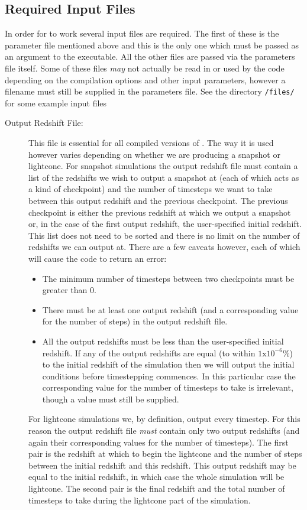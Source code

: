 \documentclass[12pt,twoside,a4paper]{article}
\begin{document}
\subsection{Required Input Files}
In order for {\PICOLA} to work several input files are required. The first of these is the parameter file mentioned above and this is the only one which must be passed as an argument to the executable. All the other files are passed via the parameters file itself. Some of these files \emph{may} not actually be read in or used by the code depending on the compilation options and other input parameters, however a filename must still be supplied in the parameters file. See the directory \texttt{/files/} for some example input files
\begin{description}
  \item[Output Redshift File:]{This file is essential for all compiled versions of {\PICOLA}. The way it is used however varies depending on whether we are producing a snapshot or lightcone. For snapshot simulations the output redshift file must contain a list of the redshifts we wish to output a snapshot at (each of which acts as a kind of checkpoint) and the number of timesteps we want to take between this output redshift and the previous checkpoint. The previous checkpoint is either the previous redshift at which we output a snapshot or, in the case of the first output redshift, the user-specified initial redshift. This list does not need to be sorted and there is no limit on the number of redshifts we can output at. There are a few caveats however, each of which will cause the code to return an error:
  \begin{itemize}
    \item{The minimum number of timesteps between two checkpoints must be greater than 0.}
    \item{There must be at least one output redshift (and a corresponding value for the number of steps) in the output redshift file.}
    \item{All the output redshifts must be less than the user-specified initial redshift. If any of the output redshifts are equal (to within $1\text{x}10^{-6}\%$)  to the initial redshift of the simulation then we will output the initial conditions before timestepping commences. In this particular case the corresponding value for the number of timesteps to take is irrelevant, though a value must still be supplied.}
  \end{itemize}

For lightcone simulations we, by definition, output every timestep. For this reason the output redshift file \emph{must} contain only two output redshifts (and again their corresponding values for the number of timesteps). The first pair is the redshift at which to begin the lightcone and the number of steps between the initial redshift and this redshift. This output redshift may be equal to the initial redshift, in which case the whole simulation will be lightcone. The second pair is the final redshift and the total number of timesteps to take during the lightcone part of the simulation.

}
\end{description}
\end{document}

